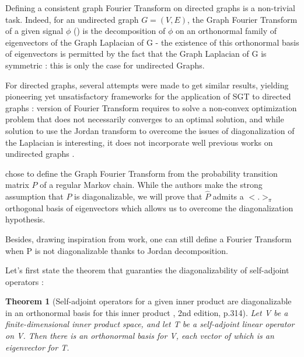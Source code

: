 \documentclass{article}
\newtheorem{theo}{Theorem}[section]
\begin{document}
Defining a consistent graph Fourier Transform on directed graphs is a non-trivial task. Indeed, for an undirected graph $G=(V,E)$, the Graph Fourier Transform of a given signal $\phi$ (\cite{ricaud_borgnat_tremblay_gonçalves_vandergheynst_2019, shuman_narang_frossard_ortega_vandergheynst_2013}) is the decomposition of $\phi$ on an orthonormal family of eigenvectors of the Graph Laplacian of G - the existence of this orthonormal basis of eigenvectors is permitted by the fact that the Graph Laplacian of G is symmetric : this is only the case for undirected Graphs. 

For directed graphs, several attempts \cite{sandryhaila_moura_2014,  sardellitti_barbarossa_lorenzo_2017} were made to get similar results, yielding pioneering yet unsatisfactory frameworks for the application of SGT to directed graphs : \cite{sardellitti_barbarossa_lorenzo_2017} version of Fourier Transform requires to solve a non-convex optimization problem that does not necessarily converges to an optimal solution, and while \cite{sandryhaila_moura_2014} solution to use the Jordan transform to overcome the issues of diagonalization of the Laplacian is interesting, it does not incorporate well previous works on undirected graphs \cite{shuman_narang_frossard_ortega_vandergheynst_2013, grinstead_snell_2006, chung_1997}.

\cite{sevi2019} chose to define the Graph Fourier Transform from the probability transition matrix $P$ of a regular Markov chain. While the authors make the strong assumption that $P$ is diagonalizable, we will prove that $\hat{P}$ admits a $<.>_{\pi}$ orthogonal basis of eigenvectors which allows us to overcome the diagonalization hypothesis. 

Besides, drawing inspiration from \cite{sandryhaila_moura_2014} work, one can still define a Fourier Transform when P is not diagonalizable thanks to Jordan decomposition.

Let's first state the theorem that guaranties the diagonalizability of self-adjoint operators :

\begin{theo}[Self-adjoint operators for a given inner product are diagonalizable in an orthonormal basis for this inner product \cite{hoffman_kunze_1962}, 2nd edition, p.314]\label{theo:self_adjoint_operators}
Let V be a finite-dimensional inner product space, and let T be a self-adjoint linear operator on V. Then there is an orthonormal basis for V, each vector of which is an eigenvector for T. 
\end{theo}
\end{document}
